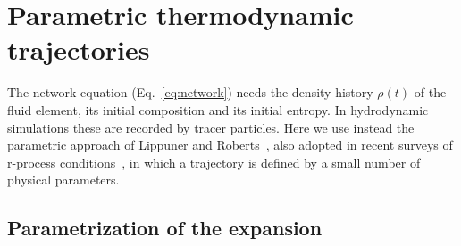 \begin{table}[t]
\caption{Setup of this work compared with that of Ref.~\cite{hernandez_porras_features_2027}.\label{tab:paper_vs_thesis}}\vspace{0.25em}
\end{table}

\section{Parametric thermodynamic trajectories}\label{sec:methods_trajectories}

The network equation (Eq.~\ref{eq:network}) needs the density history $\rho(t)$ of the fluid element, its initial composition and its initial entropy.
In hydrodynamic simulations these are recorded by tracer particles.
Here we use instead the parametric approach of Lippuner and Roberts~\cite{lippuner_r-process_2015}, also adopted in recent surveys of r-process conditions~\cite{kuske_complete_2025}, in which a trajectory is defined by a small number of physical parameters.

\subsection{Parametrization of the expansion}\label{sec:methods_expansion}

